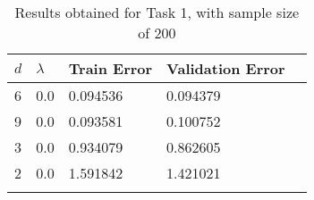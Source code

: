\def\arraystretch{1.25}
{\small
\begin{longtable}{l l l l l}
\hline
\hline
\textbf{$d$} & \textbf{$\lambda$} & \textbf{Train Error} & \textbf{Validation Error} \\
\hline
\hline
6 & 0.0 & 0.094536 & 0.094379 \\
9 & 0.0 & 0.093581 & 0.100752 \\
3 & 0.0 & 0.934079 & 0.862605 \\
2 & 0.0 & 1.591842 & 1.421021 \\
\hline
\caption{Results obtained for Task 1, with sample size of 200}
\end{longtable}
}